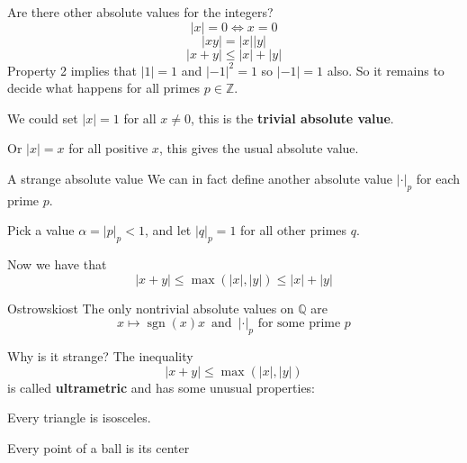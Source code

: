 \documentclass[notheorems]{beamer}
\theoremstyle{plain}
\DeclareMathOperator{\sgn}{sgn}
\newcommand{\terminology}[1]{\textbf{#1}}
\newcommand{\ZZ}{\mathbb{Z}}
\newcommand{\QQ}{\mathbb Q}
\begin{document}
\begin{frame}{Are there other absolute values for the integers?}
    \[|x| = 0 \iff x = 0\]
    \[|xy| = |x ||y|\]
    \[|x+y| \le |x | + |y|\]
    Property 2 implies that $|1|=1$ and $|-1|^2 = 1$ so $|-1|=1$ also.
    So it remains to decide what happens for all primes $p\in \ZZ$.

    We could set $|x|=1$ for all $x \ne 0$, this is the \terminology{trivial absolute value}.

    Or $|x|=x$ for all positive $x$, this gives the usual absolute value.
\end{frame}

\begin{frame}{A strange absolute value}
    We can in fact define another absolute value $|\cdot |_p$ for each prime $p$.

    Pick a value $\alpha = |p|_p < 1$, and let $|q|_p=1$ for all other primes $q$.

    Now we have that \[|x+y| \le \max(|x|, |y|) \le |x| + |y|\]


    \begin{theorem}{Ostrowski}{ost}\label{theorem-36}
        The only nontrivial absolute values on \(\QQ\) are%
        \begin{equation*}
            x \mapsto \sgn(x) x\, \text{ and }\, |\cdot|_p \text{ for some prime $p$}
        \end{equation*}
    \end{theorem}
\end{frame}

\begin{frame}{Why is it strange?}
    The inequality \[|x+y| \le \max(|x|, |y|)\] is called \terminology{ultrametric} and has some unusual properties:

    Every triangle is isosceles.


    Every point of a ball is its center


\end{frame}
\end{document}
